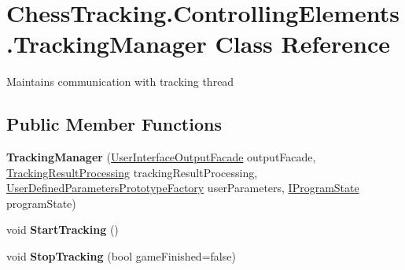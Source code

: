 \hypertarget{class_chess_tracking_1_1_controlling_elements_1_1_tracking_manager}{}\section{Chess\+Tracking.\+Controlling\+Elements.\+Tracking\+Manager Class Reference}
\label{class_chess_tracking_1_1_controlling_elements_1_1_tracking_manager}


Maintains communication with tracking thread  


\subsection*{Public Member Functions}
\begin{DoxyCompactItemize}
\item 
\mbox{\label{class_chess_tracking_1_1_controlling_elements_1_1_tracking_manager_ac35559bd2bb67c2b1ee15cef031437f3}} 
{\bfseries Tracking\+Manager} (\mbox{\hyperlink{class_chess_tracking_1_1_user_interface_1_1_user_interface_output_facade}{User\+Interface\+Output\+Facade}} output\+Facade, \mbox{\hyperlink{class_chess_tracking_1_1_controlling_elements_1_1_tracking_result_processing}{Tracking\+Result\+Processing}} tracking\+Result\+Processing, \mbox{\hyperlink{class_chess_tracking_1_1_image_processing_1_1_pipeline_data_1_1_user_defined_parameters_prototype_factory}{User\+Defined\+Parameters\+Prototype\+Factory}} user\+Parameters, \mbox{\hyperlink{interface_chess_tracking_1_1_controlling_elements_1_1_program_state_1_1_i_program_state}{I\+Program\+State}} program\+State)
\item 
\mbox{\label{class_chess_tracking_1_1_controlling_elements_1_1_tracking_manager_ad6f1b1c8f37c01e6aea72ccb24c8862d}} 
void {\bfseries Start\+Tracking} ()
\item 
\mbox{\label{class_chess_tracking_1_1_controlling_elements_1_1_tracking_manager_ad31ebf5a92763fe568dc456ee4b15ecc}} 
void {\bfseries Stop\+Tracking} (bool game\+Finished=false)
\item 
\mbox{\label{class_chess_tracking_1_1_controlling_elements_1_1_tracking_manager_a6d6077c9056d17a98501b9abdc4e4896}} 

\end{DoxyCompactItemize}
